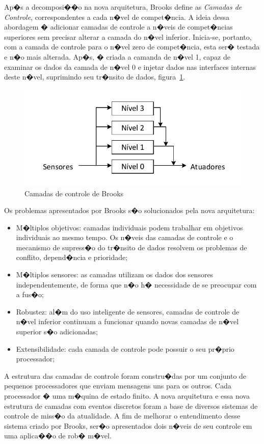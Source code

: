 Ap�s a decomposi��o na nova arquitetura, Brooks define as \emph{Camadas de
Controle}, correspondentes a cada n�vel de compet�ncia. A ideia dessa abordagem
� adicionar camadas de controle a n�veis de compet�ncias superiores sem precisar
alterar a camada do n�vel inferior. Inicia-se, portanto, com a camada de
controle para o n�vel zero de compet�ncia, esta ser� testada e n�o mais
alterada. Ap�s, � criada a camanda de n�vel 1, capaz de examinar os dados
da camada de n�vel 0 e injetar dados nas interfaces internas deste n�vel,
suprimindo seu tr�nsito de dados, figura~\ref{BROOKS_2}.

\begin{figure}[H]
\centering
\includegraphics[width=1\columnwidth]{figs/BROOKS_2.pdf}
\caption{Camadas de controle de Brooks}
\label{BROOKS_2}
\end{figure}

Os problemas apresentados por Brooks s�o solucionados pela nova arquitetura:
\begin{itemize}
  \item M�ltiplos objetivos: camadas individuais podem trabalhar em objetivos
  individuais ao mesmo tempo. Os n�veis das camadas de controle e o mecanismo de
  supress�o do tr�nsito de dados resolvem os problemas de conflito, depend�ncia
  e prioridade;
  \item M�ltiplos sensores: as camadas utilizam os dados dos sensores
  independentemente, de forma que n�o h� necessidade de se preocupar com a
  fus�o;
  \item Robustez: al�m do uso inteligente de sensores, camadas de controle de
  n�vel inferior continuam a funcionar quando novas camadas de n�vel superior
  s�o adicionadas;
  \item Extensibilidade: cada camada de controle pode possuir o seu pr�prio
  processador; 
\end{itemize}

A estrutura das camadas de controle foram constru�das por um conjunto de
pequenos processadores que enviam mensagens uns para os outros. Cada processador
� uma m�quina de estado finito. A nova arquitetura e essa nova estrutura de
camadas com eventos discretos foram a base de diversos sistemas de controle de
miss�o da atualidade. A fim de melhorar o entendimento desse sistema criado
por Brooks, ser�o apresentados dois n�veis de seu controle em uma aplica��o de rob�
m�vel.

